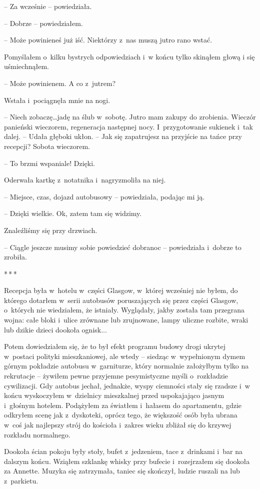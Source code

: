 \documentclass[oneside,polish,11pt,sfheadings]{mwbk}
\newcommand{\threeast}{\bigskip\par\centerline{*\,*\,*}\medskip\par}
\begin{document}
-- Za wcześnie -- powiedziała.

-- Dobrze -- powiedziałem.

-- Może powinieneś już iść. Niektórzy z~nas muszą jutro rano wstać.

Pomyślałem o~kilku bystrych odpowiedziach i~w końcu tylko skinąłem głową
i się uśmiechnąłem.

-- Może powinienem. A co z~jutrem?

Wstała i~pociągnęła mnie na nogi.

-- Niech zobaczę\ldots jadę na ślub w~sobotę. Jutro mam zakupy do zrobienia.
Wieczór panieński wieczorem, regeneracja następnej nocy. I~przygotowanie
sukienek i~tak dalej. -- Udała głęboki ukłon. -- Jak się zapatrujesz na
przyjście na tańce przy recepcji? Sobota wieczorem.

-- To brzmi wspaniale! Dzięki.

Oderwała kartkę z~notatnika i~nagryzmoliła na niej. 

-- Miejsce, czas,
dojazd autobusowy -- powiedziała, podając mi ją.

-- Dzięki wielkie. Ok, zatem tam się widzimy.

Znaleźliśmy się przy drzwiach.

-- Ciągle jeszcze musimy sobie powiedzieć dobranoc -- powiedziała i~dobrze
to zrobiła.

\threeast

Recepcja była w~hotelu w~części Glasgow, w~której wcześniej nie byłem,
do którego dotarłem w~serii autobusów poruszających się przez części
Glasgow, o~których nie wiedziałem, że istniały. Wyglądały, jakby została
tam przegrana wojna: całe bloki i~ulice zrównane lub zrujnowane, lampy
uliczne rozbite, wraki lub dzikie dzieci dookoła ognisk...

Potem dowiedziałem się, że to był efekt programu budowy drogi ukrytej w~postaci polityki mieszkaniowej, ale wtedy -- siedząc w~wypełnionym dymem
górnym pokładzie autobusu w~garniturze, który normalnie założyłbym tylko
na rekrutacje -- żywiłem pewne przyjemne pesymistyczne myśli o~rozkładzie
cywilizacji. Gdy autobus jechał, jednakże, wyspy ciemności stały się
rzadsze i~w końcu wyskoczyłem w~dzielnicy mieszkalnej przed uspokajająco
jasnym i~głośnym hotelem. Podążyłem za światłem i~hałasem do
apartamentu, gdzie odkryłem scenę jak z~dyskoteki, oprócz tego, że
większość osób była ubrana w~coś jak najlepszy strój do kościoła i~zakres wieku zbliżał się do krzywej rozkładu normalnego.

Dookoła ścian pokoju były stoły, bufet z~jedzeniem, tace z~drinkami i~bar na dalszym końcu. Wziąłem szklankę whisky przy bufecie i~rozejrzałem
się dookoła za Annette. Muzyka się zatrzymała, taniec się skończył,
ludzie ruszali na lub z~parkietu.
\end{document}

